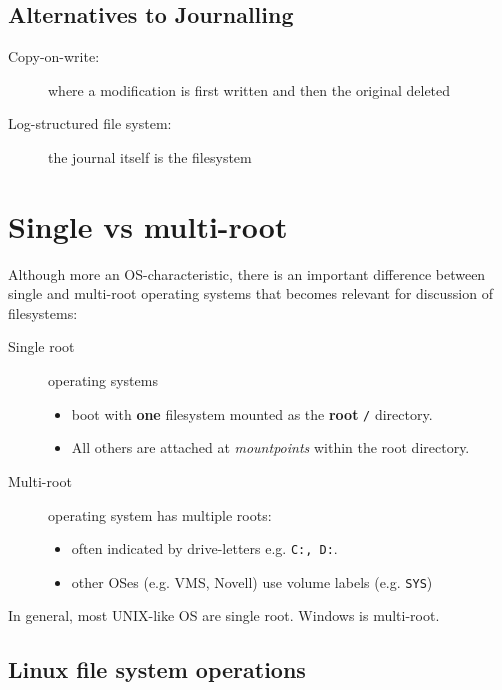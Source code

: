 \documentclass[slides]{pgnotes}
\begin{document}

\subsection{Alternatives to Journalling}
\label{sec:alternatives-to-journalling}

\begin{description}
\item[Copy-on-write:]
where a modification is first written and then the original deleted
\item[Log-structured file system:]
the journal itself is the filesystem
\end{description}

\section{Single vs multi-root}
\label{sec:single-vs-multi-root}

Although more an OS-characteristic, there is an important difference between single and multi-root operating systems that becomes relevant for discussion of filesystems:

\begin{description}
\item[Single root] operating systems
  \begin{itemize}
  \item boot with \textbf{one} filesystem mounted as the \textbf{root} \texttt{/} directory.
  \item All others are attached at \textit{mountpoints}  within the root directory.
  \end{itemize}
\item[Multi-root] operating system has multiple roots:
  \begin{itemize}
  \item often indicated by drive-letters e.g. \texttt{C:,\ D:}.
  \item other OSes (e.g. VMS, Novell) use volume labels (e.g. \texttt{SYS})
  \end{itemize}
\end{description}

In general, most UNIX-like OS are single root. Windows is multi-root.


\subsection{Linux file system operations}
\label{sec:linux}
\end{document}
